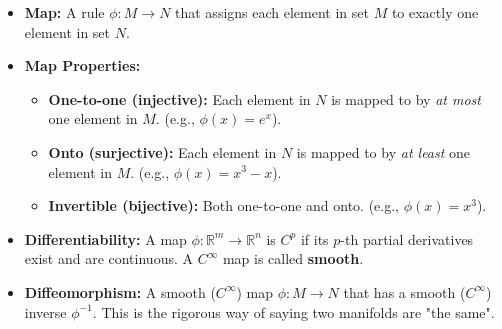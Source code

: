 \documentclass[11pt, a4paper]{report}
\begin{document}
\begin{itemize}
    \item \textbf{Map:} A rule $\phi: M \to N$ that assigns each element in set $M$ to exactly one element in set $N$.
    \item \textbf{Map Properties:}
        \begin{itemize}
            \item \textbf{One-to-one (injective):} Each element in $N$ is mapped to by \emph{at most} one element in $M$. (e.g., $\phi(x) = e^x$).
            \item \textbf{Onto (surjective):} Each element in $N$ is mapped to by \emph{at least} one element in $M$. (e.g., $\phi(x) = x^3 - x$).
            \item \textbf{Invertible (bijective):} Both one-to-one and onto. (e.g., $\phi(x) = x^3$).
        \end{itemize}
    
    
    
    
    
    


    \item \textbf{Differentiability:} A map $\phi: \mathbb{R}^m \to \mathbb{R}^n$ is $C^p$ if its $p$-th partial derivatives exist and are continuous. A $C^\infty$ map is called \textbf{smooth}.
    \item \textbf{Diffeomorphism:} A smooth ($C^\infty$) map $\phi: M \to N$ that has a smooth ($C^\infty$) inverse $\phi^{-1}$. This is the rigorous way of saying two manifolds are "the same".
\end{itemize}
\end{document}
